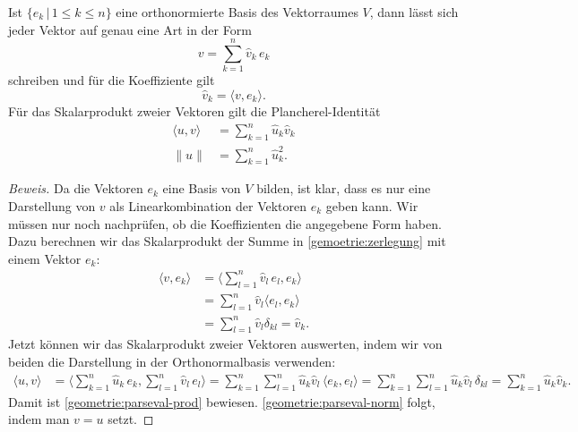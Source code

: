 \begin{satz}
\label{satz:parseval}
Ist $\{e_k\,|\, 1\le k\le n\}$ eine orthonormierte Basis des Vektorraumes
$V$, dann lässt sich jeder Vektor auf genau eine Art in der Form 
\begin{equation}
v = \sum_{k=1}^n \hat v_k\, e_k
\label{gemoetrie:zerlegung}
\end{equation}
schreiben und für die Koeffiziente gilt
\begin{equation}
\hat{v}_k = \langle v,e_k\rangle.
\label{geometrie:synthese}
\end{equation}
Für das Skalarprodukt zweier Vektoren gilt die Plancherel-Identität
%
\begin{align}
\langle u,v\rangle
&=
\sum_{k=1}^n \hat{u}_k\hat{v}_k
\label{geometrie:parseval-prod}
\\
\|u\|
&=
\sum_{k=1}^n \hat{u}_k^2.
\label{geometrie:parseval-norm}
\end{align}
\end{satz}

\begin{proof}[Beweis]
Da die Vektoren $e_k$ eine Basis von $V$ bilden, ist klar, dass es nur
eine Darstellung von $v$ als Linearkombination der Vektoren $e_k$ geben
kann.
Wir müssen nur noch nachprüfen, ob die Koeffizienten die angegebene
Form haben.
Dazu berechnen wir das Skalarprodukt der Summe in \eqref{gemoetrie:zerlegung}
mit einem Vektor $e_k$:
\begin{align*}
\langle v,e_k\rangle
&=
\biggl\langle \sum_{l=1}^n \hat{v}_l\, e_l,e_k\biggr\rangle
\\
&=
\sum_{l=1}^n \hat{v}_l\langle e_l,e_k\rangle
\\
&=
\sum_{l=1}^n \hat{v}_l\delta_{kl}
=
\hat{v}_k.
\end{align*}
Jetzt können wir das Skalarprodukt zweier Vektoren auswerten, indem
wir von beiden die Darstellung in der Orthonormalbasis verwenden:
\begin{align*}
\langle u,v\rangle
&=
\biggl\langle
\sum_{k=1}^n \hat{u}_k\, e_k,\sum_{l=1}^n \hat{v}_l\, e_l
\biggr\rangle
=
\sum_{k=1}^n \sum_{l=1}^n \hat{u}_k\hat{v}_l\, \langle e_k,e_l\rangle
=
\sum_{k=1}^n \sum_{l=1}^n \hat{u}_k\hat{v}_l\, \delta_{kl}
=
\sum_{k=1}^n \hat{u}_k\hat{v}_k.
\end{align*}
Damit ist \eqref{geometrie:parseval-prod} bewiesen.
\eqref{geometrie:parseval-norm} folgt, indem man $v=u$ setzt.
\end{proof}

